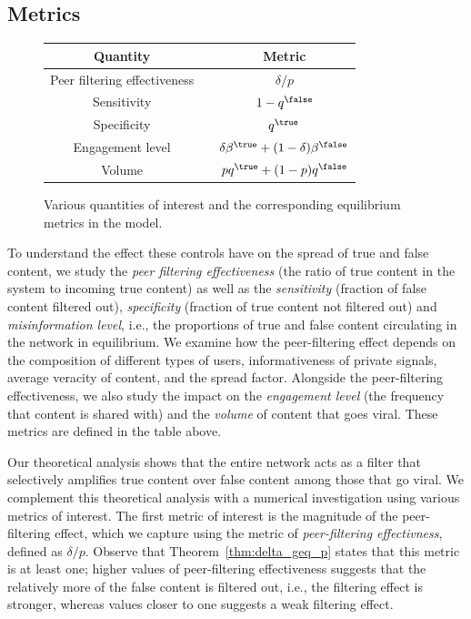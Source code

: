 \subsection{Metrics}
{\small 
\begin{figure}[htbp]
\centering
\begin{tabular}{ccc} 
  \toprule
 Quantity  & & Metric \\
 \midrule
 Peer filtering effectiveness &   & ${\delta}/{p}$ \\
  Sensitivity & & $1- q^\false$\\
 Specificity  & & $q^\true$\\
 Engagement level & & $\delta \beta^\true + (1-\delta) \beta^\false$\\
 Volume &  & $pq^\true + (1-p) q^\false$\\
  \bottomrule
\end{tabular}
\caption{Various quantities of interest and the corresponding equilibrium metrics in the model.}\label{table:metrics}


\end{figure} }
To understand the effect these controls have on the spread of true and false content, we  study the \emph{peer filtering effectiveness} (the ratio of true content in the system to incoming true content) as well as the \emph{sensitivity} (fraction of false content filtered out), \emph{specificity} (fraction of true content not filtered out) and \emph{misinformation  level}, i.e., the proportions of true and false content circulating in the network in equilibrium. We examine how the peer-filtering effect depends on the composition of different types of users, informativeness of private signals, average veracity of content, and the spread factor. Alongside the peer-filtering effectiveness, we also study the impact on the \emph{engagement level} (the frequency that content is shared with) and the \emph{volume} of content that goes viral. These metrics are defined in the table above. 


Our theoretical analysis shows that the entire network acts as a filter that selectively amplifies true content over false content among those that go viral. We  complement this theoretical analysis with a numerical investigation using various metrics of interest. The first metric of interest is the magnitude of the peer-filtering effect, which we capture using the metric of {\em peer-filtering effectivness}, defined as $\delta/p$. Observe that Theorem~\ref{thm:delta_geq_p} states that this metric is at least one; higher values of peer-filtering effectiveness suggests that the  relatively more of the false content is filtered out, i.e., the filtering effect is stronger, whereas values closer to one suggests a weak filtering effect. 

